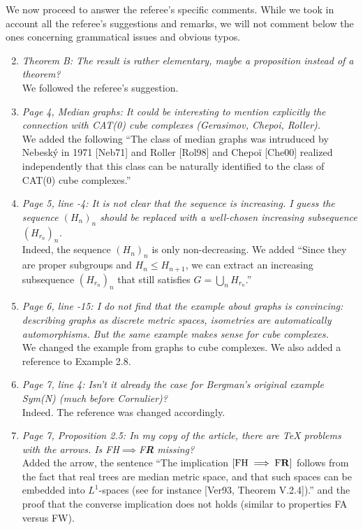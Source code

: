 \documentclass[english,a4paper]{article}
\newcommand*{\FH}{FH}
\newcommand*{\FW}{FW}
\newcommand*{\FA}{FA}
\newcommand*{\FR}{F\textbf{R}}
\begin{document}
We now proceed to answer the referee's specific comments.
While we took in account all the referee’s suggestions and remarks, we will not comment below the ones concerning grammatical issues and obvious typos.
%
%
\begin{enumerate}
%
\setcounter{enumi}{1}
\item\textit{Theorem B: The result is rather elementary, maybe a proposition instead of a theorem?}\\
We followed the referee's suggestion.
%
\item\textit{Page 4, Median graphs: It could be interesting to mention explicitly the connection with CAT(0) cube complexes (Gerasimov, Chepoi, Roller).}\\
We added the following ``The class of median graphs was intruduced by Nebesk\'y in 1971 [Neb71] and  Roller [Rol98] and Chepoï [Che00] realized independently that this class can be naturally identified to the class of CAT(0) cube complexes.''
%
\item\textit{Page 5, line -4: It is not clear that the sequence is increasing. I guess the sequence $(H_n)_n$ should be replaced with a well-chosen increasing subsequence $(H_{r_n})_n$.
}\\
Indeed, the sequence $(H_n)_n$ is only non-decreasing. We added ``Since they are proper subgroups and $H_n\leq H_{n+1}$, we can extract an increasing subsequence $(H_{r_n})_n$ that still satisfies $G=\bigcup_n H_{r_n}$.''
%
\item\textit{Page 6, line -15: I do not find that the example about graphs is convincing: describing graphs as discrete metric spaces, isometries are automatically automorphisms. But the same example makes sense for cube complexes.}\\
We changed the example from graphs to cube complexes. We also added a reference to Example 2.8.
%
\item\textit{Page 7, line 4: Isn’t it already the case for Bergman’s original example Sym(N) (much before Cornulier)?}\\
Indeed. The reference was changed accordingly.
%
\item\textit{Page 7, Proposition 2.5: In my copy of the article, there are TeX problems with the arrows. Is \FH$\implies$\FR{} missing?}\\
Added the arrow, the sentence ``The implication $[\textnormal{\FH}\implies \textnormal{\FR}]$ follows from the fact that real trees are median metric space, and that such spaces can be embedded into $L^1$-spaces (see for instance [Ver93, Theorem V.2.4]).'' and the proof that the converse implication does not holds (similar to properties \FA{} versus \FW).


\end{enumerate}
\end{document}
